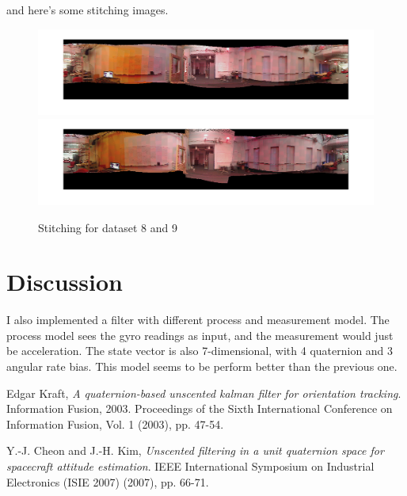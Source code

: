 \documentclass[twoside]{article}
\begin{document}
\begin{multicols}{2}
and here's some stitching images.
\begin{figure}[H]
\centering
\includegraphics[width=\columnwidth]{fig/stitching8.png} \;
\includegraphics[width=\columnwidth]{fig/stitching9.png} 
\caption{Stitching for dataset 8 and 9}
\label{fig:stitch}
\end{figure}


\section{Discussion}
I also implemented a filter with different process and measurement model. The process model sees the gyro readings as input, and the measurement would just be acceleration. The state vector is also 7-dimensional, with 4 quaternion and 3 angular rate bias. This model seems to be perform better than the previous one.


\begin{thebibliography}{2} %

Edgar Kraft, \emph{A quaternion-based unscented kalman filter for orientation tracking}. Information Fusion, 2003. Proceedings of the Sixth International Conference on Information Fusion, Vol. 1 (2003), pp. 47-54.

Y.-J. Cheon and J.-H. Kim, \emph{Unscented filtering in a unit quaternion space for spacecraft attitude estimation}. IEEE International Symposium on Industrial Electronics (ISIE 2007) (2007), pp. 66-71.


\end{thebibliography}
\end{multicols}
\end{document}
